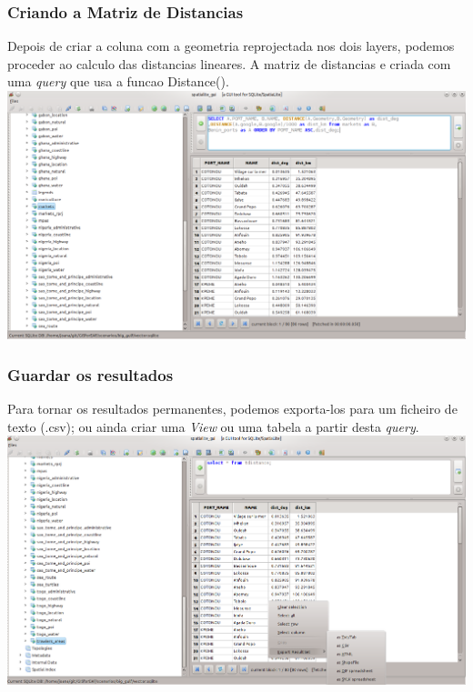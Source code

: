 \documentclass[hyperref={pdfpagelabels=true}]{beamer}
\begin{document}
\begin{frame}
\frametitle{Criando a Matriz de Distancias}
Depois de criar a coluna com a geometria reprojectada nos dois layers, podemos proceder ao calculo das distancias lineares.
A matriz de distancias e criada com uma \textit{query} que usa a funcao Distance().\\
\includegraphics[scale=0.2]{distance8.png}
\end{frame}

\begin{frame}
\frametitle{Guardar os resultados}
Para tornar os resultados permanentes, podemos exporta-los para um ficheiro de texto (.csv); ou ainda criar uma \textit{View} ou uma tabela a partir desta \textit{query}.\\
\includegraphics[scale=0.3]{distance11.png}
\end{frame}
\end{document}
